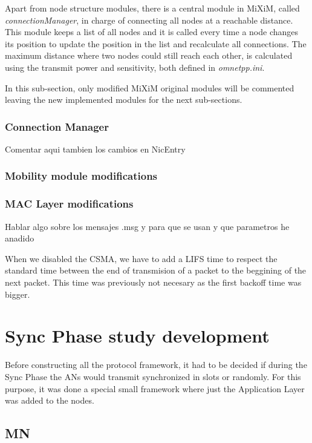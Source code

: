 Apart from node structure modules, there is a central module in \ac{MiXiM}, called \textit{connectionManager}, in charge of connecting
all nodes at a reachable distance. This module keeps a list of all nodes and it is called every time a node changes its position to
update the position in the list and recalculate all connections. The maximum distance where two nodes could still reach each other, is 
calculated using the transmit power and sensitivity, both defined in \textit{omnetpp.ini}.

In this sub-section, only modified \ac{MiXiM} original modules will be commented leaving the new implemented modules for the next sub-sections.

\subsubsection{Connection Manager}

Comentar aqui tambien los cambios en NicEntry

\subsubsection{Mobility module modifications}

\subsubsection{\ac{MAC} Layer modifications}

Hablar algo sobre los mensajes .msg y para que se usan y que parametros he anadido

When we disabled the CSMA, we have to add a LIFS time to respect the standard time between the end of transmision of a packet to the beggining of the next packet. This time was previously not necesary as the first backoff time was bigger.


\section{Sync Phase study development}

Before constructing all the protocol framework, it had to be decided if during the Sync Phase the \acp{AN} would transmit synchronized in 
slots or randomly. For this purpose, it was done a special small framework where just the Application Layer was added to the nodes.


\subsection{\ac{MN}}

